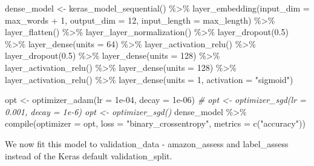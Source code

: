\documentclass[
]{article}
\newenvironment{Shaded}{}{}
\newcommand{\AttributeTok}[1]{\textcolor[rgb]{0.49,0.56,0.16}{#1}}
\newcommand{\CommentTok}[1]{\textcolor[rgb]{0.38,0.63,0.69}{\textit{#1}}}
\newcommand{\DecValTok}[1]{\textcolor[rgb]{0.25,0.63,0.44}{#1}}
\newcommand{\FloatTok}[1]{\textcolor[rgb]{0.25,0.63,0.44}{#1}}
\newcommand{\FunctionTok}[1]{\textcolor[rgb]{0.02,0.16,0.49}{#1}}
\newcommand{\NormalTok}[1]{#1}
\newcommand{\OtherTok}[1]{\textcolor[rgb]{0.00,0.44,0.13}{#1}}
\newcommand{\SpecialCharTok}[1]{\textcolor[rgb]{0.25,0.44,0.63}{#1}}
\newcommand{\StringTok}[1]{\textcolor[rgb]{0.25,0.44,0.63}{#1}}
\begin{document}
\begin{Shaded}
\begin{Highlighting}[]
\NormalTok{dense\_model }\OtherTok{\textless{}{-}} \FunctionTok{keras\_model\_sequential}\NormalTok{() }\SpecialCharTok{\%\textgreater{}\%}
    \FunctionTok{layer\_embedding}\NormalTok{(}\AttributeTok{input\_dim =}\NormalTok{ max\_words }\SpecialCharTok{+} \DecValTok{1}\NormalTok{, }\AttributeTok{output\_dim =} \DecValTok{12}\NormalTok{, }\AttributeTok{input\_length =}\NormalTok{ max\_length) }\SpecialCharTok{\%\textgreater{}\%}
    \FunctionTok{layer\_flatten}\NormalTok{() }\SpecialCharTok{\%\textgreater{}\%}
    \FunctionTok{layer\_layer\_normalization}\NormalTok{() }\SpecialCharTok{\%\textgreater{}\%}
    \FunctionTok{layer\_dropout}\NormalTok{(}\FloatTok{0.5}\NormalTok{) }\SpecialCharTok{\%\textgreater{}\%}
    \FunctionTok{layer\_dense}\NormalTok{(}\AttributeTok{units =} \DecValTok{64}\NormalTok{) }\SpecialCharTok{\%\textgreater{}\%}
    \FunctionTok{layer\_activation\_relu}\NormalTok{() }\SpecialCharTok{\%\textgreater{}\%}
    \FunctionTok{layer\_dropout}\NormalTok{(}\FloatTok{0.5}\NormalTok{) }\SpecialCharTok{\%\textgreater{}\%}
    \FunctionTok{layer\_dense}\NormalTok{(}\AttributeTok{units =} \DecValTok{128}\NormalTok{) }\SpecialCharTok{\%\textgreater{}\%}
    \FunctionTok{layer\_activation\_relu}\NormalTok{() }\SpecialCharTok{\%\textgreater{}\%}
    \FunctionTok{layer\_dense}\NormalTok{(}\AttributeTok{units =} \DecValTok{128}\NormalTok{) }\SpecialCharTok{\%\textgreater{}\%}
    \FunctionTok{layer\_activation\_relu}\NormalTok{() }\SpecialCharTok{\%\textgreater{}\%}
    \FunctionTok{layer\_dense}\NormalTok{(}\AttributeTok{units =} \DecValTok{1}\NormalTok{, }\AttributeTok{activation =} \StringTok{"sigmoid"}\NormalTok{)}

\NormalTok{opt }\OtherTok{\textless{}{-}} \FunctionTok{optimizer\_adam}\NormalTok{(}\AttributeTok{lr =} \FloatTok{1e{-}04}\NormalTok{, }\AttributeTok{decay =} \FloatTok{1e{-}06}\NormalTok{)}
\CommentTok{\# opt \textless{}{-} optimizer\_sgd(lr = 0.001, decay = 1e{-}6) opt \textless{}{-} optimizer\_sgd()}
\NormalTok{dense\_model }\SpecialCharTok{\%\textgreater{}\%}
    \FunctionTok{compile}\NormalTok{(}\AttributeTok{optimizer =}\NormalTok{ opt, }\AttributeTok{loss =} \StringTok{"binary\_crossentropy"}\NormalTok{, }\AttributeTok{metrics =} \FunctionTok{c}\NormalTok{(}\StringTok{"accuracy"}\NormalTok{))}
\end{Highlighting}
\end{Shaded}

We now fit this model to validation\_data - amazon\_assess and
label\_assess instead of the Keras default validation\_split.
\end{document}
